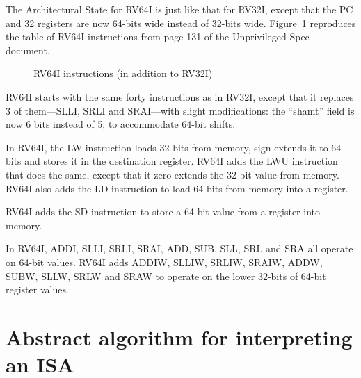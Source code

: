 \label{Sec_RV64I}

The Architectural State for RV64I is just like that for RV32I, except
that the PC and 32 registers are now 64-bits wide instead of 32-bits
wide.  Figure~\ref{Fig_RV64I} reproduces the table of RV64I
instructions from page 131 of the Unprivileged Spec document.
\begin{figure}[htbp]
  \centerline{}
  \caption{\label{Fig_RV64I} RV64I instructions (in addition to RV32I)}
\end{figure}
RV64I starts with the same forty instructions as in RV32I, except that
it replaces 3 of them---SLLI, SRLI and SRAI---with slight
modifications: the ``shamt'' field is now 6 bits instead of 5, to
accommodate 64-bit shifts.

In RV64I, the LW instruction loads 32-bits from memory, sign-extends
it to 64 bits and stores it in the destination register.  RV64I adds
the LWU instruction that does the same, except that it zero-extends
the 32-bit value from memory.  RV64I also adds the LD instruction to
load 64-bits from memory into a register.

RV64I adds the SD instruction to store a 64-bit value from a register
into memory.

In RV64I, ADDI, SLLI, SRLI, SRAI, ADD, SUB, SLL, SRL and SRA all
operate on 64-bit values.  RV64I adds ADDIW, SLLIW, SRLIW, SRAIW,
ADDW, SUBW, SLLW, SRLW and SRAW to operate on the lower 32-bits of
64-bit register values.


\section{Abstract algorithm for interpreting an ISA}

